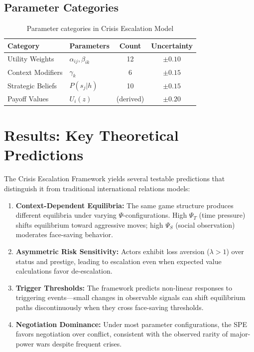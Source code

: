 \subsection{Parameter Categories}

\begin{table}[h]
\centering
\begin{tabular}{llcc}
\toprule
\textbf{Category} & \textbf{Parameters} & \textbf{Count} & \textbf{Uncertainty} \\
\midrule
Utility Weights & $\alpha_{ij}, \beta_{ik}$ & 12 & $\pm 0.10$ \\
Context Modifiers & $\gamma_k$ & 6 & $\pm 0.15$ \\
Strategic Beliefs & $P(s_j | h)$ & 10 & $\pm 0.15$ \\
Payoff Values & $U_i(z)$ & (derived) & $\pm 0.20$ \\
\bottomrule
\end{tabular}
\caption{Parameter categories in Crisis Escalation Model}
\label{tab:params}
\end{table}



\section{Results: Key Theoretical Predictions}
\label{sec:crisis-results}

The Crisis Escalation Framework yields several testable predictions that distinguish it from traditional international relations models:

\begin{enumerate}
\item \textbf{Context-Dependent Equilibria:} The same game structure produces different equilibria under varying $\Psi$-configurations. High $\Psi_T$ (time pressure) shifts equilibrium toward aggressive moves; high $\Psi_S$ (social observation) moderates face-saving behavior.

\item \textbf{Asymmetric Risk Sensitivity:} Actors exhibit loss aversion ($\lambda > 1$) over status and prestige, leading to escalation even when expected value calculations favor de-escalation.

\item \textbf{Trigger Thresholds:} The framework predicts non-linear responses to triggering events---small changes in observable signals can shift equilibrium paths discontinuously when they cross face-saving thresholds.

\item \textbf{Negotiation Dominance:} Under most parameter configurations, the SPE favors negotiation over conflict, consistent with the observed rarity of major-power wars despite frequent crises.
\end{enumerate}


